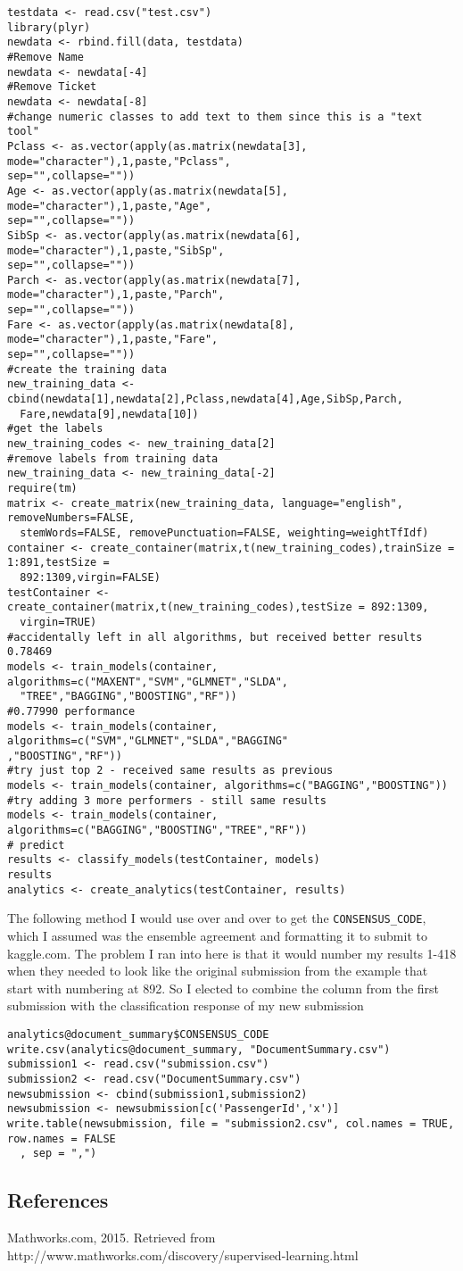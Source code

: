 \documentclass[10pt]{article}
\begin{document}
\begin{verbatim}
testdata <- read.csv("test.csv")
library(plyr)
newdata <- rbind.fill(data, testdata)
#Remove Name
newdata <- newdata[-4]
#Remove Ticket
newdata <- newdata[-8]
#change numeric classes to add text to them since this is a "text tool"
Pclass <- as.vector(apply(as.matrix(newdata[3], mode="character"),1,paste,"Pclass",
sep="",collapse=""))
Age <- as.vector(apply(as.matrix(newdata[5], mode="character"),1,paste,"Age",
sep="",collapse=""))
SibSp <- as.vector(apply(as.matrix(newdata[6], mode="character"),1,paste,"SibSp",
sep="",collapse=""))
Parch <- as.vector(apply(as.matrix(newdata[7], mode="character"),1,paste,"Parch",
sep="",collapse=""))
Fare <- as.vector(apply(as.matrix(newdata[8], mode="character"),1,paste,"Fare",
sep="",collapse=""))
#create the training data
new_training_data <- cbind(newdata[1],newdata[2],Pclass,newdata[4],Age,SibSp,Parch,
  Fare,newdata[9],newdata[10])
#get the labels
new_training_codes <- new_training_data[2]
#remove labels from training data
new_training_data <- new_training_data[-2]
require(tm)
matrix <- create_matrix(new_training_data, language="english", removeNumbers=FALSE, 
  stemWords=FALSE, removePunctuation=FALSE, weighting=weightTfIdf)
container <- create_container(matrix,t(new_training_codes),trainSize = 1:891,testSize = 
  892:1309,virgin=FALSE)
testContainer <- create_container(matrix,t(new_training_codes),testSize = 892:1309,
  virgin=TRUE)
#accidentally left in all algorithms, but received better results 0.78469
models <- train_models(container, algorithms=c("MAXENT","SVM","GLMNET","SLDA",
  "TREE","BAGGING","BOOSTING","RF"))
#0.77990 performance
models <- train_models(container, algorithms=c("SVM","GLMNET","SLDA","BAGGING"
,"BOOSTING","RF"))
#try just top 2 - received same results as previous
models <- train_models(container, algorithms=c("BAGGING","BOOSTING"))
#try adding 3 more performers - still same results
models <- train_models(container, algorithms=c("BAGGING","BOOSTING","TREE","RF"))
# predict
results <- classify_models(testContainer, models)
results
analytics <- create_analytics(testContainer, results)
\end{verbatim}
The following method I would use over and over to get the \verb|CONSENSUS_CODE|, which I assumed was the ensemble agreement and formatting it to submit to kaggle.com. The problem I ran into here is that it would number my results 1-418 when they needed to look like the original submission from the example that start with numbering at 892. So I elected to combine the column from the first submission with the classification response of my new submission
\begin{verbatim}
analytics@document_summary$CONSENSUS_CODE
write.csv(analytics@document_summary, "DocumentSummary.csv")
submission1 <- read.csv("submission.csv")
submission2 <- read.csv("DocumentSummary.csv")
newsubmission <- cbind(submission1,submission2)
newsubmission <- newsubmission[c('PassengerId','x')]
write.table(newsubmission, file = "submission2.csv", col.names = TRUE, row.names = FALSE
  , sep = ",")
\end{verbatim}
\subsection*{References}
Mathworks.com, 2015. Retrieved from http://www.mathworks.com/discovery/supervised-learning.html
\end{document}
